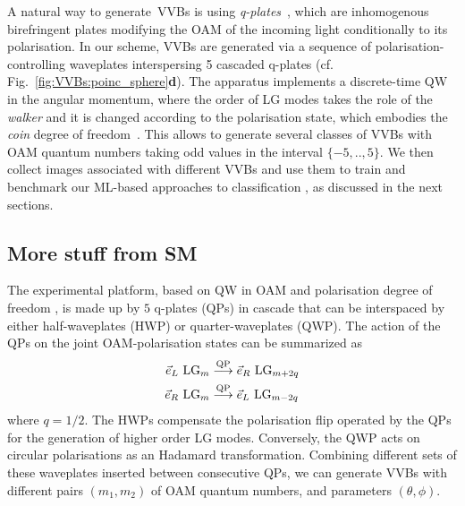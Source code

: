 A natural way to generate~\acp{VVB} is using \emph{q-plates}~\cite{marrucci2006optical,cardano2012polarization}, which are inhomogenous birefringent plates modifying the OAM of the incoming light conditionally to its polarisation. 
In our scheme, \acp{VVB} are generated via a sequence of polarisation-controlling waveplates interspersing 5 cascaded q-plates (cf. Fig.~\ref{fig:VVBs:poinc_sphere}{\bf d}).
The apparatus implements a discrete-time QW in the angular momentum, where the order of LG modes takes the role of the \emph{walker} and it is changed according to the polarisation state, which embodies the \emph{coin} degree of freedom~\cite{zhang2010implementation,goyal2013implementing,cardano2015quantum,innocenti2017quantum,giordani2019experimental}.
This allows to generate several classes of VVBs with OAM quantum numbers taking odd values in the interval $\{-5,..,5\}$.
We then collect images associated with different \acp{VVB} and use them to train and benchmark our ML-based approaches to classification , as discussed in the next sections.

\subsection{More stuff from SM}

The experimental platform, based on \ac{QW} in \ac{OAM} and polarisation degree of freedom \cite{innocenti2017quantum,giordani2019experimental}, is made up by $5$ q-plates (QPs) in cascade that can be interspaced by either half-waveplates (HWP) or quarter-waveplates (QWP). 
The action of the QPs on the joint OAM-polarisation states can be summarized as 
\begin{align}
  \Vec{e}_L \text{ LG}_m &\stackrel{\text{QP}}{\longrightarrow} \Vec{e}_R\text{ LG}_{m+2q} \notag\\ \Vec{e}_R \text{ LG}_m &\stackrel{\text{QP}}{\longrightarrow} \Vec{e}_L\text{ LG}_{m-2q}
\end{align}
where $q=1/2$. The HWPs compensate the polarisation flip operated by the QPs for the generation of higher order \ac{LG} modes. Conversely, the QWP acts on circular polarisations as an Hadamard transformation. Combining different sets of these waveplates inserted between consecutive QPs, we can generate \acp{VVB} with different pairs $(m_1,m_2)$ of OAM quantum numbers, and parameters $(\theta, \phi)$.


